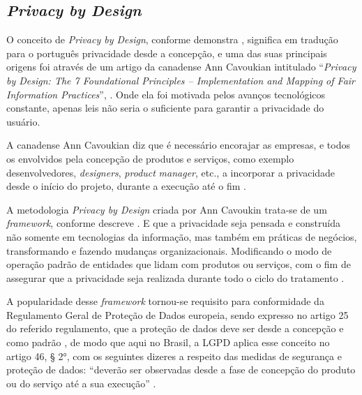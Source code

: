 \documentclass[
	12pt,				%
	openright,			%
	oneside,			%
	a4paper,			%
	english,			%
	french,				%
	spanish,			%
	brazil,				%
	]{abntex2}
\begin{document}
\subsection{ \textit{Privacy by Design}  }

O conceito de \textit{Privacy by Design}, conforme demonstra \cite{oliveira2020}, significa em tradução para o português privacidade desde a concepção, e uma das suas principais origens foi através de um artigo da canadense Ann Cavoukian intitulado “\textit{Privacy by Design: The 7 Foundational Principles – Implementation and Mapping of Fair Information Practices}”, \cite{Jimene2020}. Onde ela foi motivada pelos avanços tecnológicos constante, apenas leis não seria o suficiente para garantir a privacidade do usuário. 

A canadense Ann Cavoukian diz que é necessário encorajar as empresas, e todos os envolvidos pela concepção de produtos e serviços, como exemplo desenvolvedores, \textit{designers}, \textit{product} \textit{manager}, etc., a incorporar a privacidade desde o início do projeto, durante a execução até o fim \cite{Vainzof2020}. 

A metodologia \textit{Privacy by Design} criada por Ann Cavoukin trata-se de um \textit{framework}, conforme descreve . E que a privacidade seja pensada e construída não somente em tecnologias da informação, mas também em práticas de negócios, transformando e fazendo mudanças organizacionais. Modificando o modo de operação padrão de entidades que lidam com produtos ou serviços, com o fim de assegurar que a privacidade seja realizada durante todo o ciclo do tratamento \cite{Ana2019}.

A popularidade desse \textit{framework} tornou-se requisito para conformidade da Regulamento Geral de Proteção de Dados europeia, sendo expresso no artigo 25 do referido  regulamento, que a proteção de dados deve ser desde a concepção e como padrão \cite{oliveira2020}, de modo que aqui no Brasil, a LGPD aplica esse conceito no artigo 46, § 2°, com os seguintes dizeres a respeito das medidas de segurança e proteção de dados: “deverão ser observadas desde a fase de concepção do produto ou do serviço até a sua execução” \cite{01-01-LeiGeral}.

\end{document}
